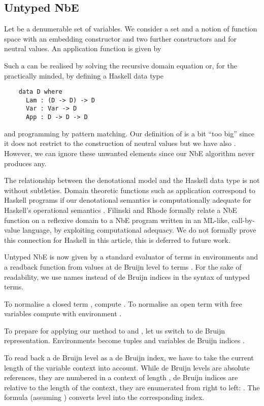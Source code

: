 \documentclass{LMCS}
\begin{document}
\subsection{Untyped NbE}
\label{sec:untyped-nbe}
Let  be a denumerable set of variables.
We consider a set  and a notion of function space 
with an embedding constructor  and two
further constructors  and  for neutral values.  An application function  is given by

Such a  can be realised by solving the recursive domain equation 
 or, for
the practically minded, by defining a Haskell data type
\begin{verbatim}
    data D where
      Lam : (D -> D) -> D
      Var : Var -> D
      App : D -> D -> D
\end{verbatim}
and programming  by pattern matching.  Our definition of
 is a bit ``too big'' since it does not restrict  to the
construction of neutral values
 but we have also
.  However, we can ignore these unwanted elements
since our NbE algorithm never produces any. 

\begin{rem}
\label{rem:comp-adequacy}
  The relationship between the denotational model\/  and the
  Haskell data type  is not without subtleties.  Domain
  theoretic functions such as application  correspond to
  Haskell programs if our denotational semantics is computationally
  adequate for Haskell's operational semantics
  \cite{plotkin:adequacy}. Filinski and Rhode
  \cite{filinskiRohde:untypedNbE} formally relate a NbE
  function on a reflexive domain\/  to a NbE program written in an
  ML-like, call-by-value language, by exploiting computational
  adequacy.  We do not formally prove this connection for Haskell in
  this article, this is deferred to future work.  
\end{rem}

Untyped NbE is now given by a standard evaluator 
of terms  in environments  and a readback function  from values  at de Bruijn level  to terms
\cite{gregoireLeroy:compiledReduction}.   For the sake of
readability, we use names instead of de Bruijn indices in the syntax
of untyped terms.

To normalise a closed term , compute .  To
normalise an open term  with free variables 
compute  with environment .

To prepare for applying our method to  and ,
let us switch to de Bruijn representation.  Environments become tuples
and variables de Bruijn indices .

To read back a de Bruijn level  as a de Bruijn index, we have
to take the current length  of the variable context into account.
While de Bruijn levels are absolute references, they are numbered
 in a context of length , de Bruijn
indices are relative to the length of the context, they are enumerated
from right to left: 
.  
The formula  (assuming ) converts level 
into the corresponding index.
\end{document}
